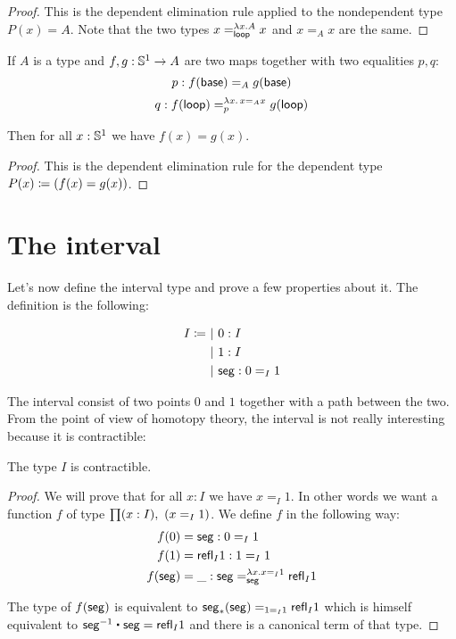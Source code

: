 \begin{proof}
  This is the dependent elimination rule applied to the nondependent type
  $P(x)=A$. Note that the two types $x=^{\lambda{}x.A}_\lloop{}x$ and $x=_Ax$
  are the same.
\end{proof}

\begin{lem}
  If $A$ is a type and $f,g:\Sn^1\to{}A$ are two maps together with two
  equalities $p,q$:
  \[p:f(\base)=_Ag(\base)\]
  \[q:\map{f}\lloop=^{\lambda{}x.\,x=_Ax}_p\map{g}\lloop\]

  Then for all $x:\Sn^1$ we have $f(x)=g(x)$.
\end{lem}

\begin{proof}
  This is the dependent elimination rule for the dependent type
  $P(x)\defeq(f(x)=g(x))$.
\end{proof}

\section{The interval}
\label{sec:interval}

Let’s now define the interval type and prove a few properties about it. The
definition is the following:

\begin{align*}
  I \defeq&\ |\ 0:I\\
  &\ |\ 1:I \\
  &\ |\ \seg:\id[I]01
\end{align*}

The interval consist of two points $0$ and $1$ together with a path between the
two. From the point of view of homotopy theory, the interval is not really
interesting because it is contractible:

\begin{lem}
  The type $I$ is contractible.
\end{lem}

\begin{proof}
  We will prove that for all $x:I$ we have $x=_I1$. In other words we want a
  function $f$ of type $\prd{x:I}(x=_I1)$. We define $f$ in the following way:
  \begin{align*}
    f(0)&=\seg:0=_I1\\
    f(1)&=\refl{I}1:1=_I1\\
    \map{f}\seg&=\_:\seg=_\seg^{\lambda{}x.x=_I1}\refl{I}1
  \end{align*}

  The type of $\map{f}\seg$ is equivalent to $\trans\seg\seg=_{1=_I1}\refl{I}1$
  which is himself equivalent to $\rev\seg\ct\seg=\refl{I}1$ and there is a
  canonical term of that type.
\end{proof}

